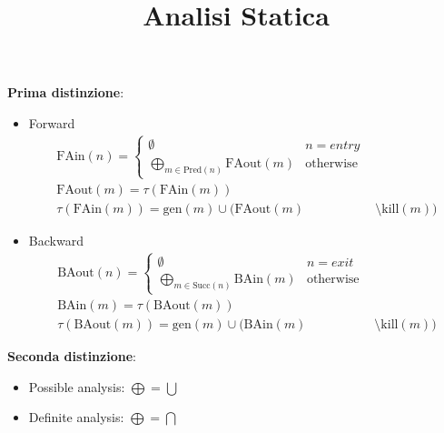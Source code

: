 \documentclass[a4paper,12pt,openany]{article}
\title{Analisi Statica}
\date{}
\begin{document}
    \maketitle
    
    \textbf{Prima distinzione}:
    \begin{itemize}
        \item Forward
        \begin{align*}
            \mbox{FAin}(n) = 
            \begin{cases}
                \emptyset & n=entry\\
                \bigoplus\limits_{m\in \mbox{Pred}(n)} \mbox{FAout}(m) & \mbox{otherwise}
            \end{cases}&\\[1em]
            \mbox{FAout}(m) = \tau(\mbox{FAin}(m))&\\
            \tau(\mbox{FAin}(m)) = \mbox{gen}(m) \cup (\mbox{FAout}(m) &\setminus \mbox{kill}(m))
        \end{align*}
        \item Backward
        \begin{align*}
            \mbox{BAout}(n) =
            \begin{cases}
                \emptyset & n=exit\\
                \bigoplus\limits_{m\in \mbox{Succ}(n)} \mbox{BAin}(m) & \mbox{otherwise}
            \end{cases}&\\[1em]
            \mbox{BAin}(m) = \tau(\mbox{BAout}(m))&\\
            \tau(\mbox{BAout}(m)) = \mbox{gen}(m) \cup (\mbox{BAin}(m) &\setminus \mbox{kill}(m))
        \end{align*}
    \end{itemize}

    \textbf{Seconda distinzione}:
    \begin{itemize}
        \item Possible analysis: $\bigoplus = \bigcup$
        \item Definite analysis: $\bigoplus = \bigcap$
    \end{itemize}
    
\end{document}
